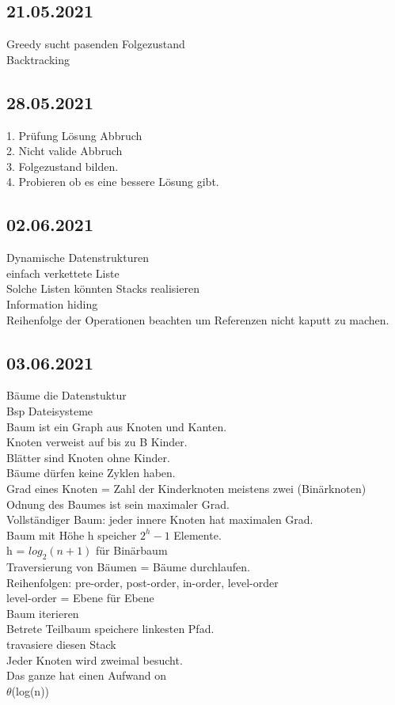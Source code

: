 \documentclass{article}
\begin{document}
 	\subsection*{21.05.2021}
 	Greedy sucht pasenden Folgezustand \\
 	Backtracking \\
 	\subsection*{28.05.2021}
 	1. Prüfung Lösung Abbruch \\
 	2. Nicht valide Abbruch \\
 	3. Folgezustand bilden. \\
 	4. Probieren ob es eine bessere Lösung gibt. \\
 	\subsection*{02.06.2021}
 	Dynamische Datenstrukturen \\
 	einfach verkettete Liste \\
 	Solche Listen könnten Stacks realisieren \\
 	Information hiding \\
 	Reihenfolge der Operationen beachten um Referenzen nicht kaputt zu machen. \\
 	\subsection*{03.06.2021}
 	Bäume die Datenstuktur \\
 	Bsp Dateisysteme \\
 	Baum ist ein Graph aus Knoten und Kanten. \\
 	Knoten verweist auf bis zu B Kinder. \\
 	Blätter sind Knoten ohne Kinder. \\
 	Bäume dürfen keine Zyklen haben. \\
 	Grad eines Knoten = Zahl der Kinderknoten meistens zwei (Binärknoten) \\
 	Odnung des Baumes ist sein maximaler Grad. \\
 	Vollständiger Baum: jeder innere Knoten hat maximalen Grad. \\
 	Baum mit Höhe h speicher $2^h - 1$ Elemente. \\
 	h = $log_{2}(n + 1)$ für Binärbaum\\
 	Traversierung von Bäumen = Bäume durchlaufen. \\
 	Reihenfolgen:
 	pre-order, post-order, in-order, level-order \\
 	level-order = Ebene für Ebene \\
 	Baum iterieren \\
 	Betrete Teilbaum speichere linkesten Pfad. \\
 	travasiere diesen Stack \\
 	Jeder Knoten wird zweimal besucht. \\
 	Das ganze hat einen Aufwand on \\  $\theta$(log(n)) \\
\end{document}
